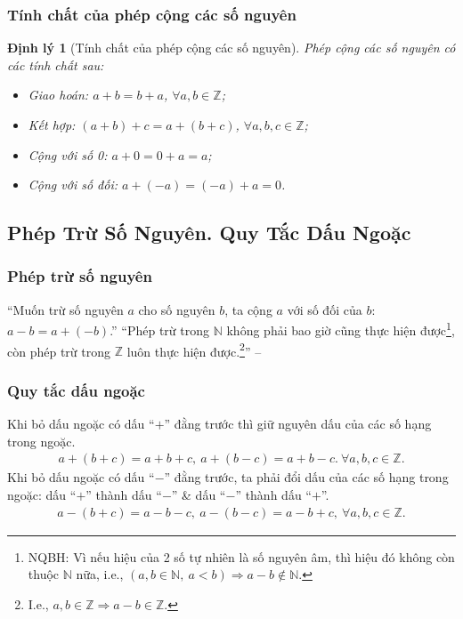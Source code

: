 \documentclass{article}
\numberwithin{equation}{section}
\newtheorem{theorem}{Định lý}[section]
\begin{document}
\subsubsection{Tính chất của phép cộng các số nguyên}

\begin{theorem}[Tính chất của phép cộng các số nguyên]
	Phép cộng các số nguyên có các tính chất sau:
	\begin{itemize}
		\item Giao hoán: $a + b = b + a$, $\forall a,b\in\mathbb{Z}$;
		\item Kết hợp: $(a + b) + c = a + (b + c)$, $\forall a,b,c\in\mathbb{Z}$;
		\item Cộng với số 0: $a + 0 = 0 + a = a$;
		\item Cộng với số đối: $a + (-a) = (-a) + a = 0$.
	\end{itemize}
\end{theorem}

\subsection{Phép Trừ Số Nguyên. Quy Tắc Dấu Ngoặc}

\subsubsection{Phép trừ số nguyên}
``Muốn trừ số nguyên $a$ cho số nguyên $b$, ta cộng $a$ với số đối của $b$: $a - b = a + (-b)$.'' ``Phép trừ trong $\mathbb{N}$ không phải bao giờ cũng thực hiện được\footnote{NQBH: Vì nếu hiệu của 2 số tự nhiên là số nguyên âm, thì hiệu đó không còn thuộc $\mathbb{N}$ nữa, i.e., $(a,b\in\mathbb{N},\ a < b)\Rightarrow a - b\notin\mathbb{N}$.}, còn phép trừ trong $\mathbb{Z}$ luôn thực hiện được.\footnote{I.e., $a,b\in\mathbb{Z}\Rightarrow a - b\in\mathbb{Z}$.}'' -- \cite[p. 76]{Thai_Anh_Dat_Ha_Loan_Nam_Quang_Toan_6_tap_1}

\subsubsection{Quy tắc dấu ngoặc}
Khi bỏ dấu ngoặc có dấu ``$+$'' đằng trước thì giữ nguyên dấu của các số hạng trong ngoặc.
\begin{align*}
	a + (b + c) = a + b + c,\ a + (b - c) = a + b - c.\ \forall a,b,c\in\mathbb{Z}.
\end{align*}
Khi bỏ dấu ngoặc có dấu ``$-$'' đằng trước, ta phải đổi dấu của các số hạng trong ngoặc: dấu ``$+$'' thành dấu ``$-$'' \& dấu ``$-$'' thành dấu ``$+$''.
\begin{align*}
	a - (b + c) = a - b - c,\ a - (b - c) = a - b + c,\ \forall a,b,c\in\mathbb{Z}.
\end{align*}
\end{document}
